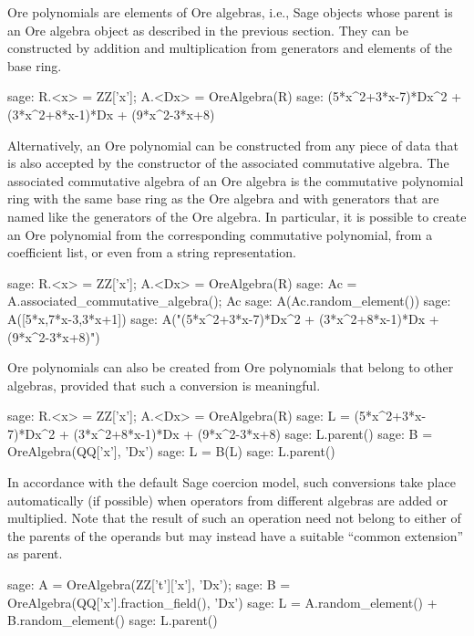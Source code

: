 \documentclass{amsart}
\begin{document}
Ore polynomials are elements of Ore algebras, i.e., Sage objects whose parent is an Ore algebra
object as described in the previous section. They can be constructed by addition and multiplication
from generators and elements of the base ring. 

\begin{sageexample}
  sage: R.<x> = ZZ['x']; A.<Dx> = OreAlgebra(R)
  sage: (5*x^2+3*x-7)*Dx^2 + (3*x^2+8*x-1)*Dx + (9*x^2-3*x+8)
\end{sageexample}

Alternatively, an Ore polynomial can be constructed from any piece of data that is also accepted
by the constructor of the associated commutative algebra. The associated commutative algebra of
an Ore algebra is the commutative polynomial ring with the same base ring as the Ore algebra 
and with generators that are named like the generators of the Ore algebra. In particular, it is
possible to create an Ore polynomial from the corresponding commutative polynomial, from a 
coefficient list, or even from a string representation.

\begin{sageexample}
  sage: R.<x> = ZZ['x']; A.<Dx> = OreAlgebra(R)
  sage: Ac = A.associated_commutative_algebra(); Ac
  sage: A(Ac.random_element())
  sage: A([5*x,7*x-3,3*x+1])
  sage: A("(5*x^2+3*x-7)*Dx^2 + (3*x^2+8*x-1)*Dx + (9*x^2-3*x+8)")
\end{sageexample}

Ore polynomials can also be created from Ore polynomials that belong to other algebras, provided
that such a conversion is meaningful. 

\begin{sageexample}
  sage: R.<x> = ZZ['x']; A.<Dx> = OreAlgebra(R)
  sage: L = (5*x^2+3*x-7)*Dx^2 + (3*x^2+8*x-1)*Dx + (9*x^2-3*x+8)
  sage: L.parent()
  sage: B = OreAlgebra(QQ['x'], 'Dx')
  sage: L = B(L)
  sage: L.parent()
\end{sageexample}

In accordance with the default Sage coercion model, such conversions take place automatically (if possible) 
when operators from different algebras are added or multiplied. Note that the result of such an operation
need not belong to either of the parents of the operands but may instead have a suitable ``common extension'' 
as parent. 

\begin{sageexample}
  sage: A = OreAlgebra(ZZ['t']['x'], 'Dx'); 
  sage: B = OreAlgebra(QQ['x'].fraction_field(), 'Dx')
  sage: L = A.random_element() + B.random_element()
  sage: L.parent()
\end{sageexample}
\end{document}
